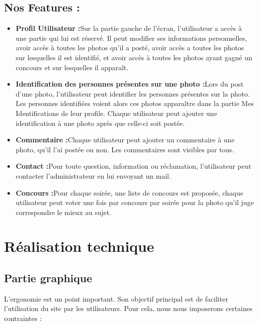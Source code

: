 \documentclass[11pt]{article} %
\begin{document}
\subsection{Nos Features :}
 \begin{itemize}
\item \textbf{Profil Utilisateur :}Sur la partie gauche de l’écran, l’utilisateur a accès à une partie qui lui est réservé. Il peut modifier ses informations personnelles, avoir accès à toutes les photos qu’il a posté, avoir accès a toutes les photos sur lesquelles il est identifié, et avoir accès à toutes les photos ayant gagné un concours et sur lesquelles il apparaît. 

\item \textbf{Identification des personnes présentes sur une photo :}Lors du post d’une photo, l’utilisateur peut identifier les personnes présentes sur la photo. Les personnes identifiées voient alors ces photos apparaître dans la partie Mes Identifications de leur profile.
Chaque utilisateur peut ajouter une identification à une photo après que celle-ci soit postée.



\item \textbf{Commentaire :}Chaque utilisateur peut ajouter un commentaire à une photo, qu’il l’ai postée ou non. Les commentaires sont visibles par tous.


\item \textbf{Contact  :}Pour toute question, information ou réclamation, l’utilisateur peut contacter l’administrateur en lui envoyant un mail. 

\item \textbf{Concours :}Pour chaque soirée, une liste de concours est proposée, chaque utilisateur peut voter une fois par concours par soirée pour la photo qu’il juge correspondre le mieux au sujet. 
\end{itemize}



\section {Réalisation technique}

\subsection {Partie graphique}
L’ergonomie est un point important. Son objectif principal est de faciliter l’utilisation du site par les utilisateurs. Pour cela, nous nous imposerons certaines contraintes :
\end{document}
